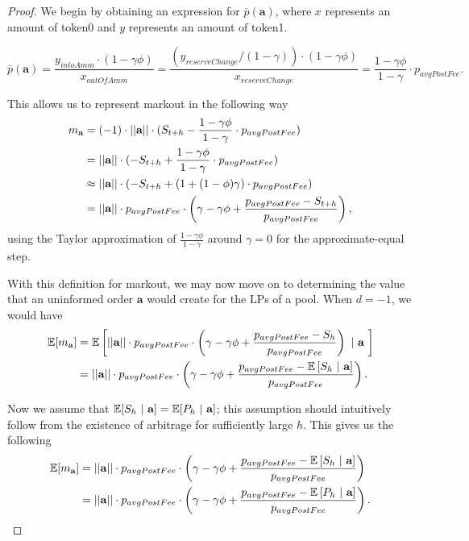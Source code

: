     \begin{proof}
        We begin by obtaining an expression for $\overline p(\textbf{a})$, where $x$ represents an amount of token0 and $y$ represents an amount of token1.

            $$\bar p(\textbf{a}) = \frac{y_{intoAmm} \cdot (1-\gamma\phi)}{x_{outOfAmm}} = \frac{(y_{reserveChange}/(1-\gamma)) \cdot (1-\gamma \phi)}{x_{reserveChange}} = \frac{1-\gamma\phi}{1-\gamma} \cdot p_{avgPostFee}.$$
        
        This allows us to represent markout in the following way
        \begin{align*}
            m_{\textbf a} 
                & = (-1) \cdot ||\textbf{a}|| \cdot (S_{t+h} - \frac{1-\gamma\phi}{1-\gamma} \cdot p_{avgPostFee}) \\
                & = ||\textbf{a}|| \cdot (- S_{t+h} + \frac{1-\gamma\phi}{1-\gamma} \cdot p_{avgPostFee}) \\
                & \approx ||\textbf{a}|| \cdot (- S_{t+h} + (1 + (1-\phi)\gamma) \cdot p_{avgPostFee}) \\
                & = ||\textbf{a}|| \cdot p_{avgPostFee} \cdot \left( \gamma - \gamma \phi + \frac{p_{avgPostFee} - S_{t+h}}{p_{avgPostFee}} \right),
        \end{align*}
        using the Taylor approximation of $\frac{1-\gamma \phi}{1-\gamma}$ around $\gamma=0$ for the approximate-equal step.

        With this definition for markout, we may now move on to determining the value that an uninformed order $\textbf{a}$ would create for the LPs of a pool. When $d=-1$, we would have
        \begin{align*}
            \mathbb E[m_\textbf a] 
                & = \mathbb E \left[
                    ||\textbf{a}|| \cdot p_{avgPostFee} \cdot \left( \gamma - \gamma \phi + \frac{p_{avgPostFee} - S_{h}}{p_{avgPostFee}} \right) \ | \ \textbf a \ 
                \right] \\
                & = ||\textbf{a}|| \cdot p_{avgPostFee} \cdot \left( \gamma - \gamma \phi + \frac{p_{avgPostFee} - \mathbb E \left[S_{h} \ | \ \textbf a \right]}{p_{avgPostFee}} \right).
        \end{align*}

        Now we assume that $\mathbb E[S_{h} \ | \ \textbf a] = \mathbb E[P_{h} \ | \ \textbf a]$; this assumption should intuitively follow from the existence of arbitrage for sufficiently large $h$. This gives us the following
            \begin{align*}
                \mathbb E[m_\textbf a]
                    & = ||\textbf{a}|| \cdot p_{avgPostFee} \cdot \left( \gamma - \gamma \phi + \frac{p_{avgPostFee} - \mathbb E \left[S_{h} \ | \ \textbf a \right]}{p_{avgPostFee}} \right) \\
                    & = ||\textbf{a}|| \cdot p_{avgPostFee} \cdot \left( \gamma - \gamma \phi + \frac{p_{avgPostFee} - \mathbb E \left[P_{h} \ | \ \textbf a \right]}{p_{avgPostFee}} \right).
            \end{align*}
    

\end{proof}
